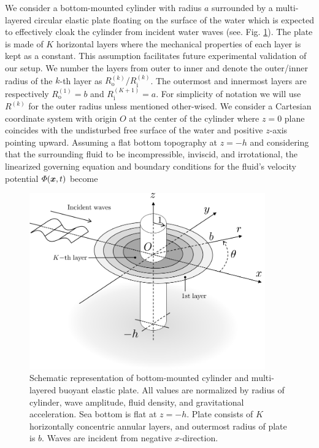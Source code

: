 \documentclass{jfm}
\begin{document}
We consider a bottom-mounted cylinder with radius $a$ surrounded by a multi-layered circular elastic plate floating on the surface of the water which is expected to effectively cloak the cylinder from incident water waves (see. Fig. \ref{fig1}). The plate is made of $K$ horizontal layers where the mechanical properties of each layer is kept as a constant. This assumption facilitates future experimental validation of our setup. We number the layers from outer to inner and denote the outer/inner radius of the $k$-th layer as $R_\text{o}^{(k)}/R_\text{i}^{(k)}$. The outermost and innermost layers are respectively  $R_\text{o}^{(1)}=b$ and $R_\text{i}^{(K+1)}=a$. For simplicity of notation we will use $R^{(k)}$ for the outer radius unless mentioned other-wised. We consider a Cartesian coordinate system with origin $O$ at the center of the cylinder where $z=0$ plane coincides with the undisturbed free surface of the water and positive $z$-axis pointing upward. Assuming a flat bottom topography at $z=-h$ and considering that the surrounding fluid to be incompressible,  inviscid,  and irrotational, the linearized governing equation and boundary conditions for the fluid's velocity potential $\Phi(\mbox{\boldmath $x$}, t)$ become
\begin{figure}
 \centering
 \includegraphics[width=4.00in]{./fig/fig1.png}
 \caption{Schematic representation of bottom-mounted cylinder and multi-layered buoyant elastic plate. All values are normalized by radius of cylinder, wave amplitude, fluid density, and gravitational acceleration. Sea bottom is flat at $z=-h$. Plate consists of $K$ horizontally concentric annular layers, and outermost radius of plate is $b$. Waves are incident from negative $x$-direction.}
 \label{fig1}
\end{figure}
\end{document}
